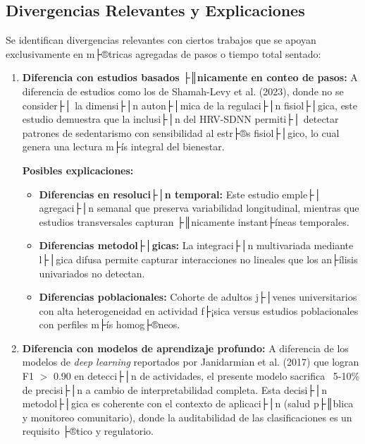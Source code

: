 \subsection{Divergencias Relevantes y Explicaciones}
\label{subsec:divergencias}

Se identifican divergencias relevantes con ciertos trabajos que se apoyan exclusivamente en m├®tricas agregadas de pasos o tiempo total sentado:

\begin{enumerate}
    \item \textbf{Diferencia con estudios basados ├║nicamente en conteo de pasos:} A diferencia de estudios como los de Shamah-Levy et al. (2023), donde no se consider├│ la dimensi├│n auton├│mica de la regulaci├│n fisiol├│gica, este estudio demuestra que la inclusi├│n del HRV-SDNN permiti├│ detectar patrones de sedentarismo con sensibilidad al estr├®s fisiol├│gico, lo cual genera una lectura m├ís integral del bienestar. 
    
    \textbf{Posibles explicaciones:}
    \begin{itemize}
        \item \textbf{Diferencias en resoluci├│n temporal:} Este estudio emple├│ agregaci├│n semanal que preserva variabilidad longitudinal, mientras que estudios transversales capturan ├║nicamente instant├íneas temporales.
        \item \textbf{Diferencias metodol├│gicas:} La integraci├│n multivariada mediante l├│gica difusa permite capturar interacciones no lineales que los an├ílisis univariados no detectan.
        \item \textbf{Diferencias poblacionales:} Cohorte de adultos j├│venes universitarios con alta heterogeneidad en actividad f├¡sica versus estudios poblacionales con perfiles m├ís homog├®neos.
    \end{itemize}
    
    \item \textbf{Diferencia con modelos de aprendizaje profundo:} A diferencia de los modelos de \textit{deep learning} reportados por Janidarmian et al. (2017) que logran F1 $>$ 0.90 en detecci├│n de actividades, el presente modelo sacrifica ~5-10\% de precisi├│n a cambio de interpretabilidad completa. Esta decisi├│n metodol├│gica es coherente con el contexto de aplicaci├│n (salud p├║blica y monitoreo comunitario), donde la auditabilidad de las clasificaciones es un requisito ├®tico y regulatorio.
\end{enumerate}


